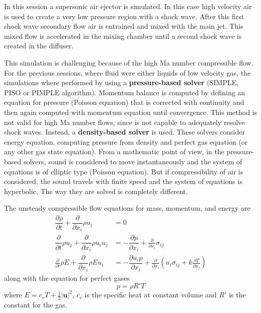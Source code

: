 \documentclass[
    parskip=half,      %
    DIV=12,            %
    headings=normal,   %
    fontsize=11pt,     %
    english            %
]{scrartcl}
\begin{document}
In this session a supersonic air ejector is simulated. In this case high velocity air is used 
 to create a very low pressure region with a shock wave. After this first shock wave secondary
 flow air is entrained and mixed with the main jet. This mixed flow is  accelerated in the mixing
 chamber until a second shock wave is created in the diffuser. 
 
 This simulation is challenging because of the high Ma number compressible flow. For the 
 previous sessions, where fluid were either liquids of low velocity gas, the simulations
 where performed by using a \textbf{pressure-based solver} (SIMPLE, PISO or PIMPLE algorithm). 
 Momentum balance is computed by defining an equation for pressure (Poisson equation) that
 is corrected with continuity and then again computed with momentum equation until convergence.
 This method is not valid for high Ma number flows, since is not capable to adequately resolve
 shock waves. Instead, a \textbf{density-based solver} is used. These solvers consider energy equation,
 computing pressure from density and perfect gas equation (or any other gas state equation). From a mathematic point of view, in the pressure-based solvers, sound is considered to move
 instantaneously and the system of equations is of elliptic type (Poisson equation). But if
 compressibility of air is considered, the sound travels with finite speed and the 
 system of equations is hyperbolic. The way they are solved is completely different.
 
 The unsteady compressible flow equations for mass, momentum, and energy are
 \begin{align}
 	\label{eqns1}
 	\dfrac{\partial \rho}{\partial t} + \dfrac{\partial} {\partial x_i} \rho u_i& = 0 \\
 	\label{eqns2}
 	\dfrac{\partial}{\partial t} \rho u_j + \dfrac{\partial}{\partial x_i} \rho u_i u_j& = 
 	-\dfrac{\partial p}{\partial x_i} + \frac{\partial}{\partial x_i} \sigma_{ij}
 	\\
 	\label{eqns3}
 	\frac{\partial}{\partial t}\rho E + \dfrac{\partial}{\partial x_i} \rho E u_i& =
 	-\dfrac{\partial u_i p}{\partial x_i} + \frac{\partial}{\partial x_i} 
 	\left( u_i \sigma_{ij}  + k\frac{\partial T}{\partial x_j}\right)
 \end{align} %
 along with the equation for perfect gases
 \begin{equation}
 	p=\rho R'T
 	\label{eqGas}
 \end{equation} %
 where $E=c_vT + \frac{1}{2}\left| \mathbf{u}\right|^2$, $c_v$ is the specific heat at constant volume and $R'$ is the constant for the gas. 
 
\end{document}
